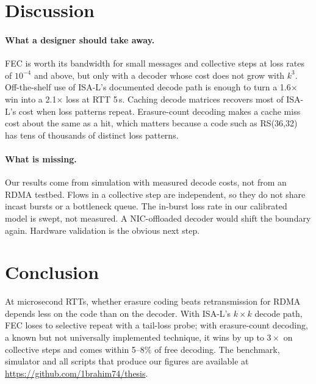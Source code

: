\documentclass[10pt,twocolumn]{article}
\begin{document}


\section{Discussion}
\label{sec:discussion}

\paragraph{What a designer should take away.} FEC is worth its bandwidth for small messages and
collective steps at loss rates of $10^{-4}$ and above, but only with a decoder whose cost does not
grow with $k^3$. Off-the-shelf use of ISA-L's documented decode path is enough to turn a 1.6$\times$
win into a 2.1$\times$ loss at RTT 5\,\textmu s. Caching decode matrices recovers most of ISA-L's
cost when loss patterns repeat. Erasure-count decoding makes a cache miss cost about the same as a
hit, which matters because a code such as RS(36,32) has tens of thousands of distinct loss
patterns.

\paragraph{What is missing.} Our results come from simulation with measured decode costs, not from
an RDMA testbed. Flows in a collective step are independent, so they do not share incast bursts
or a bottleneck queue. The in-burst loss rate in our calibrated model is swept, not measured.
A NIC-offloaded decoder would shift the boundary again. Hardware validation is the obvious next
step.

\section{Conclusion}

At microsecond RTTs, whether erasure coding beats retransmission for RDMA depends less on the code
than on the decoder. With ISA-L's $k\times k$ decode path, FEC loses to selective repeat with a
tail-loss probe; with erasure-count decoding, a known but not universally implemented technique,
it wins by up to $3\times$ on collective steps and comes within 5--8\% of free decoding. The
benchmark, simulator and all scripts that produce our figures are available at
\url{https://github.com/1brahim74/thesis}.



\end{document}
